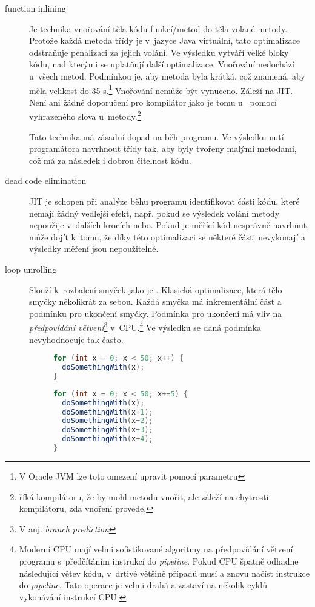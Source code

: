 \begin{description}
\item[function inlining] Je technika vnořování těla kódu funkcí/metod do těla volané metody. Protože každá metoda třídy je v~jazyce Java virtuální, tato optimalizace odstraňuje penalizaci za jejich volání. Ve výsledku vytváří velké bloky kódu, nad kterými se uplatňují další optimalizace. Vnořování nedochází u~všech metod. Podmínkou je, aby metoda byla krátká, což znamená, aby měla velikost do 35 \bytecode s.\footnote{V Oracle JVM lze toto omezení upravit pomocí parametru } Vnořování nemůže být vynuceno. Záleží na JIT. Není ani žádné doporučení pro kompilátor jako je tomu u~\CC{} pomocí vyhrazeného slova  u~metody.\footnote{ říká kompilátoru, že by mohl metodu vnořit, ale záleží na chytrosti kompilátoru, zda vnoření provede\cite{Stroustrup:1997:CPL:523265}.}

Tato technika má zásadní dopad na běh programu. Ve výsledku nutí programátora navrhnout třídy tak, aby byly tvořeny malými metodami, což má za následek i dobrou čitelnost kódu.

\item[dead code elimination] JIT je schopen při analýze běhu programu identifikovat části kódu, které nemají žádný vedlejší efekt, např. pokud se výsledek volání metody nepoužije v~dalších krocích nebo. Pokud je měřící kód nesprávně navrhnut, může dojít k~tomu, že díky této optimalizaci se některé části nevykonají a výsledky měření jsou nepoužitelné.

\item[loop unrolling] Slouží k~rozbalení smyček jako je .
Klasická optimalizace, která tělo smyčky  několikrát za sebou. Každá smyčka má inkrementální část a podmínku pro ukončení smyčky.
Podmínka pro ukončení má vliv na \emph{předpovídání větvení}\footnote{V anj. \emph{branch prediction}} v~CPU.\footnote{Moderní CPU mají velmi sofistikované algoritmy na předpovídání větvení programu s~předčítáním instrukcí do \emph{pipeline}.
Pokud CPU špatně odhadne následující větev kódu, v~drtivé většině případů musí  a znovu načíst instrukce do \emph{pipeline}.
Tato operace je velmi drahá a zastaví na několik cyklů vykonávání instrukcí CPU.}
Ve výsledku se daná podmínka nevyhodnocuje tak často.

\begin{figure}
\begin{lstlisting}[frame=single,language=Java,caption=Před loop unrolling]
for (int x = 0; x < 50; x++) {
  doSomethingWith(x);
}
\end{lstlisting}
\begin{lstlisting}[frame=single,language=Java,caption=Po loop unrolling]
for (int x = 0; x < 50; x+=5) {
  doSomethingWith(x);
  doSomethingWith(x+1);
  doSomethingWith(x+2);
  doSomethingWith(x+3);
  doSomethingWith(x+4);
}
\end{lstlisting}
\end{figure}
\end{description}

